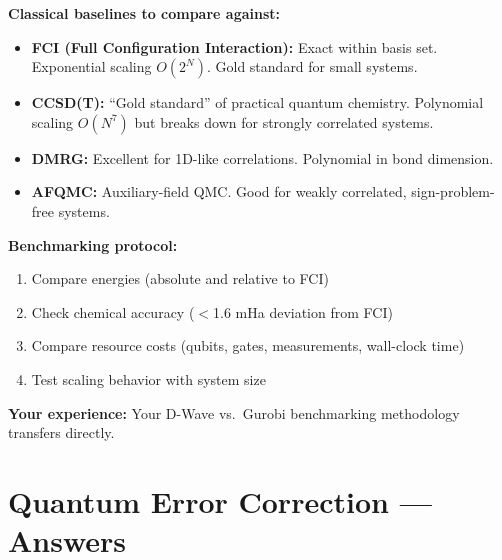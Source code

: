 \documentclass[11pt,a4paper]{article}
\begin{document}
\begin{answerbox}
\textbf{Classical baselines to compare against:}
\begin{itemize}
    \item \textbf{FCI (Full Configuration Interaction):} Exact within basis set. Exponential scaling $O(2^N)$. Gold standard for small systems.
    \item \textbf{CCSD(T):} ``Gold standard'' of practical quantum chemistry. Polynomial scaling $O(N^7)$ but breaks down for strongly correlated systems.
    \item \textbf{DMRG:} Excellent for 1D-like correlations. Polynomial in bond dimension.
    \item \textbf{AFQMC:} Auxiliary-field QMC. Good for weakly correlated, sign-problem-free systems.
\end{itemize}
\textbf{Benchmarking protocol:}
\begin{enumerate}
    \item Compare energies (absolute and relative to FCI)
    \item Check chemical accuracy ($<$1.6 mHa deviation from FCI)
    \item Compare resource costs (qubits, gates, measurements, wall-clock time)
    \item Test scaling behavior with system size
\end{enumerate}
\textbf{Your experience:} Your D-Wave vs.\ Gurobi benchmarking methodology transfers directly.
\end{answerbox}


\section{Quantum Error Correction --- Answers}
\end{document}
